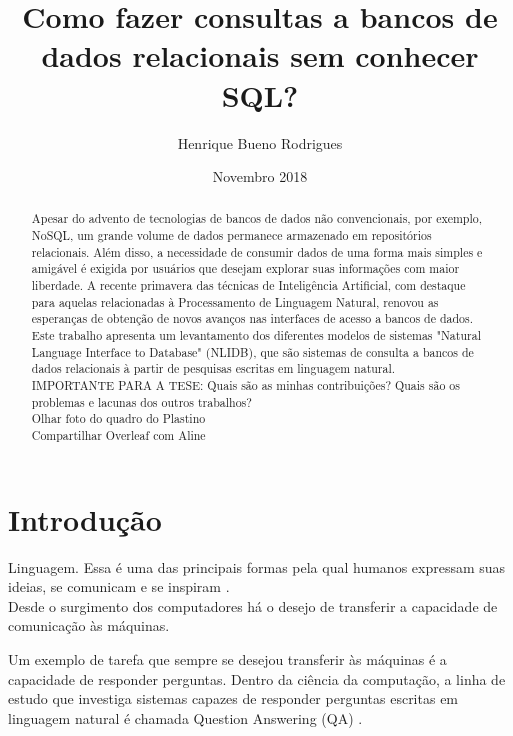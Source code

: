 \documentclass{article}
\title{Como fazer consultas a bancos de dados relacionais sem conhecer SQL?}
\author{Henrique Bueno Rodrigues}
\date{Novembro 2018}
\begin{document}
\maketitle
\begin{abstract}
Apesar do advento de tecnologias de bancos de dados não convencionais, por exemplo, NoSQL, um grande volume de dados permanece armazenado em repositórios relacionais. Além disso, a necessidade de consumir dados de uma forma mais simples e amigável é exigida por usuários que desejam explorar suas informações com maior liberdade. A recente primavera das técnicas de Inteligência Artificial, com destaque para aquelas relacionadas à Processamento de Linguagem Natural, renovou as esperanças de obtenção de novos avanços nas interfaces de acesso a bancos de dados. Este trabalho apresenta um levantamento dos diferentes modelos de sistemas "Natural Language Interface to Database" (NLIDB), que são sistemas de consulta a bancos de dados relacionais à partir de pesquisas escritas em linguagem natural.\\

IMPORTANTE PARA A TESE: Quais são as minhas contribuições? Quais são os problemas e lacunas dos outros trabalhos?\\

Olhar foto do quadro do Plastino\\

Compartilhar Overleaf com Aline
\end{abstract}

\section{Introdução}

Linguagem. Essa é uma das principais formas pela qual humanos expressam suas ideias, se comunicam e se inspiram \citep{harari2014sapiens}.\\

Desde o surgimento dos computadores há o desejo de transferir a capacidade de comunicação às máquinas. %

Um exemplo de tarefa que sempre se desejou transferir às máquinas é a capacidade de responder perguntas. Dentro da ciência da computação, a linha de estudo que investiga sistemas capazes de responder perguntas escritas em linguagem natural é chamada Question Answering (QA) \citep{hirschman2001natural}.\\
\end{document}
